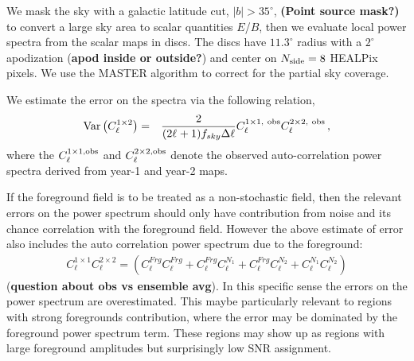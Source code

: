\documentclass[a4paper,11pt]{article}
\begin{document}
We mask the sky with a galactic latitude cut, $|b|>35^{\circ}$, \textbf{(Point source mask?)} to convert a large sky area to scalar quantities $E$/$B$, then we evaluate local power spectra from the scalar maps in discs.  The discs have $11.3^{\circ}$ radius with a $2^{\circ}$ apodization (\textbf{apod inside or outside?}) and center on $N_{\rm side} = 8$ HEALPix pixels.  We use the MASTER algorithm \citep{} to correct for the partial sky coverage.


We estimate the error on the spectra via the following relation,
\begin{eqnarray}
{\rm Var}\left( {C^{1 \times 2}_{\ell}} \right) &=&{\frac{2}{(2\ell_{}+1) f_{sky} \Delta \ell}} {C^{1\times 1,{\ \rm obs}}_{\ell} C^{2\times 2,{\ \rm obs}}_{\ell}}\,,
\end{eqnarray}
where the $C_{\ell}^{1\times 1,{\rm obs}}$ and $C_{\ell}^{2\times 2,{\rm obs}}$ denote the observed auto-correlation power spectra derived from year-1 and year-2 maps.

 If the foreground field is to be treated as a non-stochastic field, then the relevant errors on the power spectrum should only have contribution from noise and its chance correlation with the foreground field.  However the above estimate of error also includes the auto correlation power spectrum due to the foreground: \begin{eqnarray}
C^{1 \times 1}_{\ell} C^{2\times 2}_{\ell} =
  \left( C^{Frg}_{\ell} C^{Frg}_{\ell} + C^{Frg}_{\ell} C^{N_1}_{\ell} + C^{Frg}_{\ell} C^{N_2}_{\ell} + C^{N_1}_{\ell} C^{N_2}_{\ell} \right)
\end{eqnarray}  (\textbf{question about obs vs ensemble avg}).
In this specific sense the errors on the power spectrum are overestimated. This maybe particularly relevant to regions with strong foregrounds contribution, where the error may be dominated by the foreground power spectrum term. These regions may show up as regions with large foreground amplitudes but surprisingly low SNR assignment.
\end{document}
